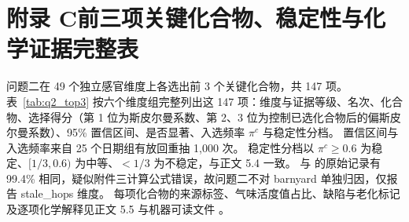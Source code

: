 \section*{附录 C\quad 前三项关键化合物、稳定性与化学证据完整表}

问题二在 49 个独立感官维度上各选出前 3 个关键化合物，共 147 项。
表~\ref{tab:q2_top3} 按六个维度组完整列出这 147 项：维度与证据等级、名次、化合物、选择得分（第 1 位为斯皮尔曼系数、第 2、3 位为控制已选化合物后的偏斯皮尔曼系数）、95\% 置信区间、是否显著、入选频率 $\pi^c$ 与稳定性分档。
置信区间与入选频率来自 25 个日期组有放回重抽 1{,}000 次。
稳定性分档以 $\pi^c\ge0.6$ 为稳定、$[1/3,0.6)$ 为中等、$<1/3$ 为不稳定，与正文 5.4 一致。
 与  的原始记录有 99.4\% 相同，疑似附件三计算公式错误，故问题二不对 barnyard 单独归因，仅报告 stale\_hops 维度。
每项化合物的来源标签、气味活度值占比、缺陷与老化标记及逐项化学解释见正文 5.5 与机器可读文件 。

